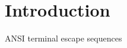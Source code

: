     

    \hypertarget{index_Introduction}{}\section{Introduction}\label{index_Introduction}
A\+N\+SI terminal escape sequences

      